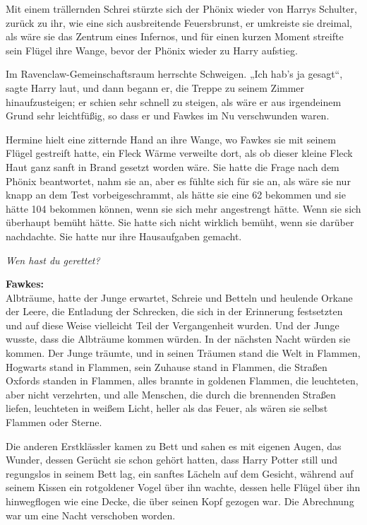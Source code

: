 {Mit einem trällernden Schrei stürzte sich der Phönix wieder von Harrys Schulter, zurück zu ihr, wie eine sich ausbreitende Feuersbrunst, er umkreiste sie dreimal, als wäre sie das Zentrum eines Infernos, und für einen kurzen Moment streifte sein Flügel ihre Wange, bevor der Phönix wieder zu Harry aufstieg.

Im Ravenclaw-Gemeinschaftsraum herrschte Schweigen. „Ich hab's ja gesagt“, sagte Harry laut, und dann begann er, die Treppe zu seinem Zimmer hinaufzusteigen; er schien sehr schnell zu steigen, als wäre er aus irgendeinem Grund sehr leichtfüßig, so dass er und Fawkes im Nu verschwunden waren.

Hermine hielt eine zitternde Hand an ihre Wange, wo Fawkes sie mit seinem Flügel gestreift hatte, ein Fleck Wärme verweilte dort, als ob dieser kleine Fleck Haut ganz sanft in Brand gesetzt worden wäre. Sie hatte die Frage nach dem Phönix beantwortet, nahm sie an, aber es fühlte sich für sie an, als wäre sie nur knapp an dem Test vorbeigeschrammt, als hätte sie eine 62 bekommen und sie hätte 104 bekommen können, wenn sie sich mehr angestrengt hätte. Wenn sie sich überhaupt bemüht hätte. Sie hatte sich nicht wirklich bemüht, wenn sie darüber nachdachte. Sie hatte nur ihre Hausaufgaben gemacht.

\emph{Wen hast du gerettet?}

\textbf{Fawkes:}\\ Albträume, hatte der Junge erwartet, Schreie und Betteln und heulende Orkane der Leere, die Entladung der Schrecken, die sich in der Erinnerung festsetzten und auf diese Weise vielleicht Teil der Vergangenheit wurden. Und der Junge wusste, dass die Albträume kommen würden. In der nächsten Nacht würden sie kommen. Der Junge träumte, und in seinen Träumen stand die Welt in Flammen, Hogwarts stand in Flammen, sein Zuhause stand in Flammen, die Straßen Oxfords standen in Flammen, alles brannte in goldenen Flammen, die leuchteten, aber nicht verzehrten, und alle Menschen, die durch die brennenden Straßen liefen, leuchteten in weißem Licht, heller als das Feuer, als wären sie selbst Flammen oder Sterne.

Die anderen Erstklässler kamen zu Bett und sahen es mit eigenen Augen, das Wunder, dessen Gerücht sie schon gehört hatten, dass Harry Potter still und regungslos in seinem Bett lag, ein sanftes Lächeln auf dem Gesicht, während auf seinem Kissen ein rotgoldener Vogel über ihn wachte, dessen helle Flügel über ihn hinwegflogen wie eine Decke, die über seinen Kopf gezogen war. Die Abrechnung war um eine Nacht verschoben worden.

}
